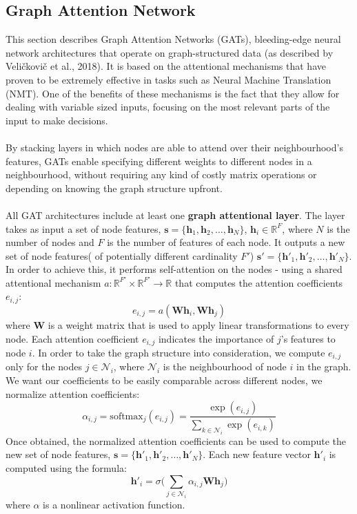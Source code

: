 	\subsection{Graph Attention Network}	
	This section describes Graph Attention Networks (GATs), bleeding-edge neural network architectures that operate on graph-structured data (as described by Veli\v{c}kovi\v{c} et al., 2018). It is based on the attentional mechanisms that have proven to be extremely effective in tasks such as Neural Machine Translation (NMT). One of the benefits of these mechanisms is the fact that they allow for dealing with variable sized inputs, focusing on the most relevant parts of the input to make decisions. 
	\\ \\ 
	By stacking layers in which nodes are able to attend over their neighbourhood's features, GATs enable specifying different weights to different nodes in a neighbourhood, without requiring any kind of costly matrix operations or depending on knowing the graph structure upfront. 
	\\ \\
	All GAT architectures include at least one \textbf{graph attentional layer}. The layer takes as input a set of node features, $\mathbf{s} = \{\mathbf{h}_1, \mathbf{h}_2, \dots , \mathbf{h}_N \}$, $\mathbf{h}_i \in \mathbb{R}^F$, where $N$ is the number of nodes and $F$ is the number of features of each node. It outputs a new set of node features( of potentially different cardinality $F'$) $\mathbf{s'} = \{ \mathbf{h'}_1, \mathbf{h'}_2, \dots , \mathbf{h'}_N \}$. In order to achieve this, it performs self-attention on the nodes - using a shared attentional mechanism $a:\mathbb{R}^{F'}\times\mathbb{R}^{F'}\rightarrow\mathbb{R}$ that computes the attention coefficients $e_{i,j}$:
	\begin{equation}
		e_{i,j} = a(\mathbf{W}\mathbf{h}_i, \mathbf{W}\mathbf{h}_j)		
	\end{equation} 
	where $\mathbf{W}$ is a weight matrix that is used to apply linear transformations to every node. Each attention coefficient $e_{i,j}$ indicates the importance of $j$'s features to node $i$. In order to take the graph structure into consideration, we compute $e_{i,j}$ only for the nodes $j \in \mathcal{N}_i$, where $\mathcal{N}_i$ is the neighbourhood of node $i$ in the graph. We want our coefficients to be easily comparable across different nodes, we normalize attention coefficients:
	\begin{equation}
		\alpha_{i,j} = \text{softmax}_j(e_{i,j}) = \frac{\exp(e_{i,j})}{\sum_{k\in \mathcal{N}_i} \exp(e_{i,k})}
	\end{equation}
	Once obtained, the normalized attention coefficients can be used to compute the new set of node features, $\mathbf{s} = \{ \mathbf{h'}_1, \mathbf{h'}_2, \dots , \mathbf{h'}_N  \}$. Each new feature vector $\mathbf{h'}_i$ is computed using the formula:
	\begin{equation}
		\mathbf{h'}_i = \sigma \Bigg( \sum_{j \in \mathcal{N}_i} \alpha_{i,j} \mathbf{W} \mathbf{h}_j \Bigg) 
	\end{equation}
	where $\alpha$ is a nonlinear activation function. 
